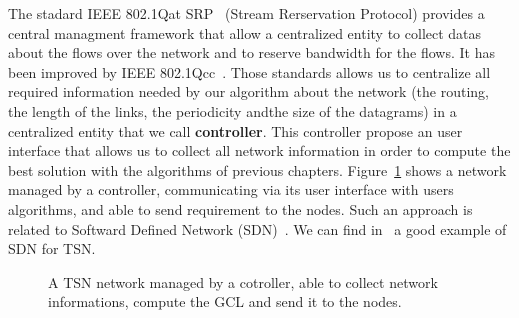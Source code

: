 The stadard IEEE 802.1Qat SRP~\cite{article} (Stream Rerservation Protocol) provides a central managment framework that allow a centralized entity to collect datas about the flows over the network and to reserve bandwidth for the flows. It has been improved by IEEE 802.1Qcc~\cite{6755436}. Those standards allows us to centralize all required information needed by our algorithm about the network (the routing, the length of the links, the periodicity andthe size of the datagrams) in a centralized entity that we call \textbf{controller}. This controller propose an user interface that allows us to collect all network information in order to compute the best solution with the algorithms of previous chapters. Figure~\ref{fig:networkcontroller} shows a network managed by a controller, communicating via its user interface with users algorithms, and able to send requirement to the nodes. Such an approach is related to Softward Defined Network (SDN)~\cite{li2015software}. We can find in~\cite{7356556} a good example of SDN for TSN.


\begin{figure}
\begin{center}


 \caption{A TSN network managed by a cotroller, able to collect network informations, compute the GCL and send it to the nodes.}

\label{fig:networkcontroller}
\end{center}
\end{figure}


